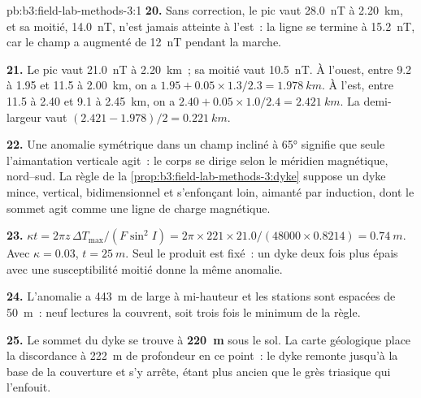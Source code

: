 \begin{solution}{pb:b3:field-lab-methods-3:1}
\textbf{20.} Sans correction, le pic vaut \qty{28.0}{nT} à \qty{2.20}{km}, et
sa moitié, \qty{14.0}{nT}, n'est jamais atteinte à l'est~: la ligne se termine à
\qty{15.2}{nT}, car le champ a augmenté de \qty{12}{nT} pendant la
marche.

\textbf{21.} Le pic vaut \qty{21.0}{nT} à \qty{2.20}{km}~; sa moitié vaut
\qty{10.5}{nT}. À l'ouest, entre \num{9.2} à \num{1.95} et \num{11.5} à
\qty{2.00}{km}, on a $1.95 + 0.05\times1.3/2.3 = \qty{1.978}{km}$. À l'est,
entre \num{11.5} à \num{2.40} et \num{9.1} à \qty{2.45}{km}, on a
$2.40 + 0.05\times1.0/2.4 = \qty{2.421}{km}$. La demi-largeur vaut $(2.421
- 1.978)/2 = \qty{0.221}{km}$.

\textbf{22.} Une anomalie symétrique dans un champ incliné à \ang{65} signifie que seule
l'aimantation verticale agit~: le corps se dirige selon le méridien magnétique,
nord--sud. La règle de la
\cref{prop:b3:field-lab-methods-3:dyke} suppose un dyke mince, vertical,
bidimensionnel et s'enfonçant loin, aimanté par induction, dont
le sommet agit comme une ligne de charge magnétique.

\textbf{23.} $\kappa t = 2\pi z\,\Delta T_\mathrm{max}/(F\sin^2 I) = 2\pi\times
221\times21.0/(48000\times0.8214) = \qty{0.74}{m}$. Avec $\kappa =
0.03$, $t = \qty{25}{m}$. Seul le produit est fixé~: un dyke deux fois
plus épais avec une susceptibilité moitié donne la même anomalie.

\textbf{24.} L'anomalie a \qty{443}{m} de large à mi-hauteur et les stations
sont espacées de \qty{50}{m}~: neuf lectures la couvrent, soit trois fois
le minimum de la règle.

\textbf{25.} Le sommet du dyke se trouve à
\textbf{\qty[text-series-to-math=true]{220}{m}} sous le sol. La
carte géologique place la discordance à \qty{222}{m} de profondeur en ce point~:
le dyke remonte jusqu'à la base de la couverture et s'y arrête, étant plus ancien
que le grès triasique qui l'enfouit.
\end{solution}
